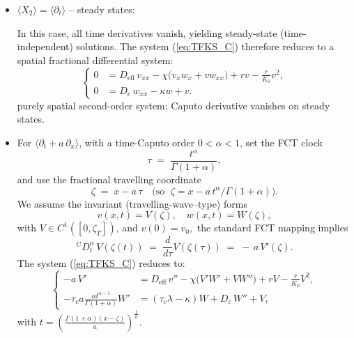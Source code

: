 \documentclass{article}
\begin{document}
\begin{description}
\begin{itemize}
\begin{equation}
\begin{cases}
\tau_c w_t=( -\kappa)w + v.
\end{cases}
\end{equation}
\item[\textbf{II.B)}] $\langle X_2\rangle=\langle\partial_t\rangle$ -- steady states:
\par  
In this case, all time derivatives vanish, yielding steady-state (time-independent) solutions. The system (\ref{eq:TFKS_C}) therefore reduces to a spatial fractional differential system:
\begin{equation}\label{eq:5.5}
\begin{cases}
0 &= D_{\mathrm{eff}}\, v_{xx} - \chi\big(v_x w_x + v w_{xx}\big) + r v - \frac{r}{K_0} v^2,\\[4pt]
0 &= D_c\,w_{xx} - \kappa w + v.
\end{cases}
\end{equation}
purely spatial second-order system; Caputo derivative vanishes on steady states.
\item[\textbf{II.C)}] For $\langle\partial_t+ a\,\partial_x\rangle$, with a time-Caputo order $0<\alpha < 1$, set the FCT clock
\begin{equation*}
\tau \;=\; \frac{t^{\alpha}}{\Gamma(1+\alpha)},
\end{equation*}
and use the fractional travelling coordinate
\begin{equation*}
\zeta \;=\; x - a\,\tau \quad\bigl(\text{so }\; \zeta = x - a\,t^{\alpha}/\Gamma(1+\alpha)\bigr).
\end{equation*}
We assume the invariant (travelling-wave--type) forms 
\begin{equation*}
v(x,t)=V(\zeta),\quad w(x,t)=W(\zeta),
\end{equation*}
with $V\in C^1([0,\zeta_T])$, and $v(0)=v_0,$
the standard FCT mapping implies
\begin{equation*}
{}^{\mathrm C}D_t^{\alpha}\,V(\zeta(t)) \;=\; \frac{d}{d\tau}V(\zeta(\tau))
\;=\; -\,a\,V'(\zeta).
\end{equation*}
The system (\ref{eq:TFKS_C}) reduces to:
\begin{equation}\label{eq:reduced_II.C}
\begin{cases}
-a\,V' &= D_{\mathrm{eff}}\,v'' - \chi\bigl(V'W' + V W''\bigr) + rV - \frac{r}{K_0}V^2,\\
-\tau_c a\frac{\alpha t^{\alpha-1}}{\Gamma (1+\alpha)} W' &= (\tau_c \lambda -\kappa) W + D_c\,W'' + V,
\end{cases}
\end{equation}
with $t=\left( \frac{\Gamma (1+\alpha)(x-\zeta)}{a}\right)^\frac{1}{\alpha}$.

\end{itemize}
\end{description}
\end{document}
